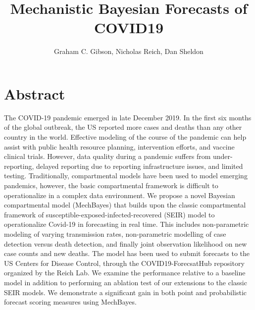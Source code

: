 \documentclass[11pt]{amsart}
\title{Mechanistic Bayesian Forecasts of COVID19}
\author{Graham C. Gibson, Nicholas Reich, Dan Sheldon}
\begin{document}
\maketitle

\section*{Abstract}

The COVID-19 pandemic emerged in late December 2019. In the first six months of the global outbreak, the US reported more cases and deaths than any other country in the world. Effective modeling of the course of the pandemic can help assist with public health resource planning, intervention efforts, and vaccine clinical trials. However, data quality during a pandemic suffers from under-reporting, delayed reporting due to reporting infrastructure issues, and limited testing. Traditionally, compartmental models have been used to model emerging pandemics, however, the basic compartmental framework is difficult to operationalize in a complex data environment. We propose a novel Bayesian compartmental model (MechBayes) that builds upon the classic compartmental framework of susceptible-exposed-infected-recovered (SEIR) model to operationalize Covid-19 in forecasting in real time. This includes non-parametric modeling of varying transmission rates, non-parametric modelling of case detection versus death detection, and finally joint observation likelihood on new case counts and new deaths. The model has been used to submit forecasts to the US Centers for Disease Control, through the COVID19-ForecsatHub repository organized by the Reich Lab. We examine the performance relative to a baseline model in addition to performing an ablation test of our extensions to the classic SEIR models. We demonstrate a significant gain in both point and probabilistic forecast scoring measures using MechBayes.
\end{document}
